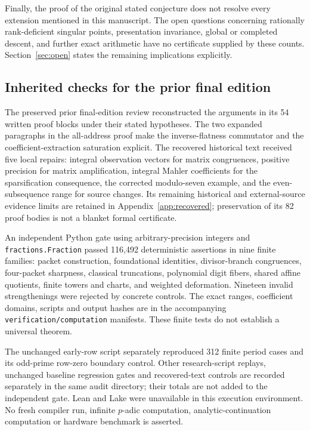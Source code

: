Finally, the proof of the original stated conjecture does not resolve every
extension mentioned in this manuscript. The open questions concerning
rationally rank-deficient singular points, presentation invariance, global
or completed descent, and further exact arithmetic have no certificate
supplied by these counts. Section~\ref{sec:open} states the remaining implications explicitly.

\subsection{Inherited checks for the prior final edition}
The preserved prior final-edition review reconstructed the arguments in its 54 written
proof blocks under their stated hypotheses. The two expanded paragraphs
in the all-address proof make the inverse-flatness commutator and the
coefficient-extraction saturation explicit. The recovered historical text
received five local repairs: integral observation vectors for matrix
congruences, positive precision for matrix amplification, integral Mahler
coefficients for the sparsification consequence, the corrected modulo-seven
example, and the even-subsequence range for source changes. Its remaining
historical and external-source evidence limits are retained in
Appendix~\ref{app:recovered}; preservation of its 82 proof bodies is not
a blanket formal certificate.

An independent Python gate using arbitrary-precision integers and
\texttt{fractions.Fraction} passed 116,492 deterministic assertions in nine
finite families: packet construction, foundational identities, divisor-branch
congruences, four-packet sharpness, classical truncations, polynomial digit
fibers, shared affine quotients, finite towers and charts, and weighted
deformation. Nineteen invalid strengthenings were rejected by concrete
controls. The exact ranges, coefficient domains, scripts and output hashes
are in the accompanying \nolinkurl{verification/computation} manifests.
These finite tests do not establish a universal theorem.

The unchanged early-row script separately reproduced 312 finite period
cases and its odd-prime row-zero boundary control. Other research-script
replays, unchanged baseline regression gates and recovered-text controls
are recorded separately in the same audit directory; their totals are
not added to the independent gate. Lean and Lake were unavailable in this
execution environment. No fresh compiler run, infinite $p$-adic computation,
analytic-continuation computation or hardware benchmark is asserted.


